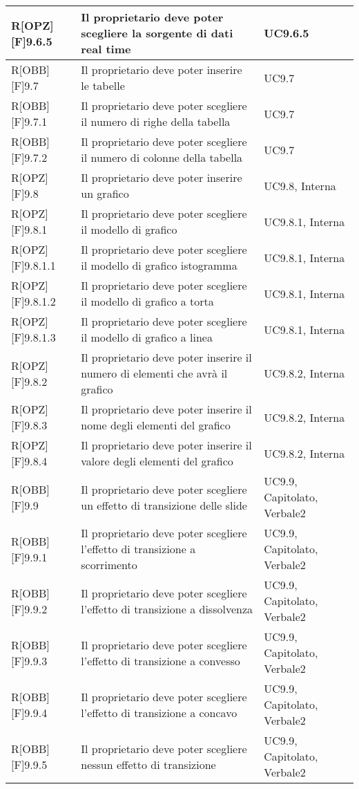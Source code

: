 	\begin{table}[h]
		\begin{tabular}{|p{}|p{}|p{}|}
			\midrule

			R[OPZ][F]9.6.5 & Il proprietario deve poter scegliere la sorgente di dati real time & UC9.6.5 \\ \midrule
			R[OBB][F]9.7 & Il proprietario deve poter inserire le tabelle & UC9.7 \\ \midrule
			R[OBB][F]9.7.1 & Il proprietario deve poter scegliere il numero di righe della tabella & UC9.7 \\ \midrule
			R[OBB][F]9.7.2 & Il proprietario deve poter scegliere il numero di colonne della tabella & UC9.7 \\ \midrule
			R[OPZ][F]9.8 & Il proprietario deve poter inserire un grafico & UC9.8, Interna \\ \midrule
			R[OPZ][F]9.8.1 & Il proprietario deve poter scegliere il modello di grafico & UC9.8.1, Interna \\ \midrule
			R[OPZ][F]9.8.1.1 & Il proprietario deve poter scegliere il modello di grafico istogramma & UC9.8.1, Interna \\ \midrule
			R[OPZ][F]9.8.1.2 & Il proprietario deve poter scegliere il modello di grafico a torta & UC9.8.1, Interna \\ \midrule
			R[OPZ][F]9.8.1.3 & Il proprietario deve poter scegliere il modello di grafico a linea & UC9.8.1, Interna \\ \midrule
			R[OPZ][F]9.8.2 & Il proprietario deve poter inserire il numero di elementi che avrà il grafico & UC9.8.2, Interna \\ \midrule
			R[OPZ][F]9.8.3 & Il proprietario deve poter inserire il nome degli elementi del grafico  & UC9.8.2, Interna \\ \midrule
			R[OPZ][F]9.8.4 & Il proprietario deve poter inserire il valore degli elementi del grafico & UC9.8.2, Interna \\ \midrule
			R[OBB][F]9.9 & Il proprietario deve poter scegliere un effetto di transizione delle \gls{slide} & UC9.9, Capitolato, Verbale2 \\ \midrule
			R[OBB][F]9.9.1 & Il proprietario deve poter scegliere l'effetto di transizione a scorrimento & UC9.9, Capitolato, Verbale2 \\ \midrule
			R[OBB][F]9.9.2 & Il proprietario deve poter scegliere l'effetto di transizione a dissolvenza & UC9.9, Capitolato, Verbale2 \\ \midrule
			R[OBB][F]9.9.3 & Il proprietario deve poter scegliere l'effetto di transizione a convesso & UC9.9, Capitolato, Verbale2 \\ \midrule
			R[OBB][F]9.9.4 & Il proprietario deve poter scegliere l'effetto di transizione a concavo & UC9.9, Capitolato, Verbale2 \\ \midrule
			R[OBB][F]9.9.5 & Il proprietario deve poter scegliere nessun effetto di transizione & UC9.9, Capitolato, Verbale2 \\ \midrule

		\end{tabular}
	\end{table}
	\newpage
	
